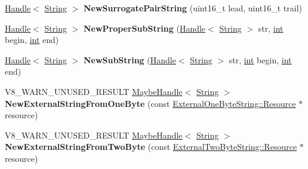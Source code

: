 \begin{DoxyCompactItemize}
\mbox{\hyperlink{classv8_1_1internal_1_1Handle}{Handle}}$<$ \mbox{\hyperlink{classv8_1_1internal_1_1String}{String}} $>$ {\bfseries New\+Surrogate\+Pair\+String} (uint16\+\_\+t lead, uint16\+\_\+t trail)
\item 
\mbox{\label{classv8_1_1internal_1_1Factory_aca365dc67763f00c5ac9017e2ccdeaf4}} 
\mbox{\hyperlink{classv8_1_1internal_1_1Handle}{Handle}}$<$ \mbox{\hyperlink{classv8_1_1internal_1_1String}{String}} $>$ {\bfseries New\+Proper\+Sub\+String} (\mbox{\hyperlink{classv8_1_1internal_1_1Handle}{Handle}}$<$ \mbox{\hyperlink{classv8_1_1internal_1_1String}{String}} $>$ str, \mbox{\hyperlink{classint}{int}} begin, \mbox{\hyperlink{classint}{int}} end)
\item 
\mbox{\label{classv8_1_1internal_1_1Factory_afc4ab3ce7d896876c15e5a894644f9d9}} 
\mbox{\hyperlink{classv8_1_1internal_1_1Handle}{Handle}}$<$ \mbox{\hyperlink{classv8_1_1internal_1_1String}{String}} $>$ {\bfseries New\+Sub\+String} (\mbox{\hyperlink{classv8_1_1internal_1_1Handle}{Handle}}$<$ \mbox{\hyperlink{classv8_1_1internal_1_1String}{String}} $>$ str, \mbox{\hyperlink{classint}{int}} begin, \mbox{\hyperlink{classint}{int}} end)
\item 
\mbox{\label{classv8_1_1internal_1_1Factory_a26cd320023a11a2e72fa0c3a04ee6494}} 
V8\+\_\+\+W\+A\+R\+N\+\_\+\+U\+N\+U\+S\+E\+D\+\_\+\+R\+E\+S\+U\+LT \mbox{\hyperlink{classv8_1_1internal_1_1MaybeHandle}{Maybe\+Handle}}$<$ \mbox{\hyperlink{classv8_1_1internal_1_1String}{String}} $>$ {\bfseries New\+External\+String\+From\+One\+Byte} (const \mbox{\hyperlink{classv8_1_1String_1_1ExternalOneByteStringResource}{External\+One\+Byte\+String\+::\+Resource}} $\ast$resource)
\item 
\mbox{\label{classv8_1_1internal_1_1Factory_a7be3ba2e22303abf6819461184969fd8}} 
V8\+\_\+\+W\+A\+R\+N\+\_\+\+U\+N\+U\+S\+E\+D\+\_\+\+R\+E\+S\+U\+LT \mbox{\hyperlink{classv8_1_1internal_1_1MaybeHandle}{Maybe\+Handle}}$<$ \mbox{\hyperlink{classv8_1_1internal_1_1String}{String}} $>$ {\bfseries New\+External\+String\+From\+Two\+Byte} (const \mbox{\hyperlink{classv8_1_1String_1_1ExternalStringResource}{External\+Two\+Byte\+String\+::\+Resource}} $\ast$resource)
\item 
\mbox{\label{classv8_1_1internal_1_1Factory_af4994cbdf3ff62c27c442ecfabc19590}} 

\end{DoxyCompactItemize}
